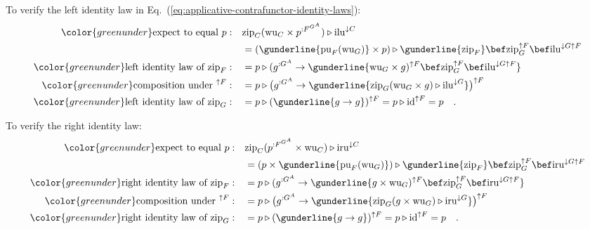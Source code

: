 To verify the left identity law in Eq.~(\ref{eq:applicative-contrafunctor-identity-laws}):
\begin{align*}
{\color{greenunder}\text{expect to equal }p:}\quad & \text{zip}_{C}(\text{wu}_{C}\times p^{:F^{G^{A}}})\triangleright\text{ilu}^{\downarrow C}\\
 & =(\gunderline{\text{pu}_{F}(\text{wu}_{G})}\times p)\triangleright\gunderline{\text{zip}_{F}}\bef\text{zip}_{G}^{\uparrow F}\bef\text{ilu}^{\downarrow G\uparrow F}\\
{\color{greenunder}\text{left identity law of }\text{zip}_{F}:}\quad & =p\triangleright(g^{:G^{A}}\rightarrow\gunderline{\text{wu}_{G}\times g)^{\uparrow F}\bef\text{zip}_{G}^{\uparrow F}\bef\text{ilu}^{\downarrow G\uparrow F}}\\
{\color{greenunder}\text{composition under }^{\uparrow F}:}\quad & =p\triangleright\big(g^{:G^{A}}\rightarrow\gunderline{\text{zip}_{G}(\text{wu}_{G}\times g)\triangleright\text{ilu}^{\downarrow G}}\big)^{\uparrow F}\\
{\color{greenunder}\text{left identity law of }\text{zip}_{G}:}\quad & =p\triangleright(\gunderline{g\rightarrow g})^{\uparrow F}=p\triangleright\text{id}^{\uparrow F}=p\quad.
\end{align*}

To verify the right identity law:
\begin{align*}
{\color{greenunder}\text{expect to equal }p:}\quad & \text{zip}_{C}(p^{:F^{G^{A}}}\times\text{wu}_{C})\triangleright\text{iru}^{\downarrow C}\\
 & =(p\times\gunderline{\text{pu}_{F}(\text{wu}_{G})})\triangleright\gunderline{\text{zip}_{F}}\bef\text{zip}_{G}^{\uparrow F}\bef\text{iru}^{\downarrow G\uparrow F}\\
{\color{greenunder}\text{right identity law of }\text{zip}_{F}:}\quad & =p\triangleright(g^{:G^{A}}\rightarrow\gunderline{g\times\text{wu}_{G})^{\uparrow F}\bef\text{zip}_{G}^{\uparrow F}\bef\text{iru}^{\downarrow G\uparrow F}}\\
{\color{greenunder}\text{composition under }^{\uparrow F}:}\quad & =p\triangleright\big(g^{:G^{A}}\rightarrow\gunderline{\text{zip}_{G}(g\times\text{wu}_{G})\triangleright\text{iru}^{\downarrow G}}\big)^{\uparrow F}\\
{\color{greenunder}\text{right identity law of }\text{zip}_{G}:}\quad & =p\triangleright(\gunderline{g\rightarrow g})^{\uparrow F}=p\triangleright\text{id}^{\uparrow F}=p\quad.
\end{align*}

